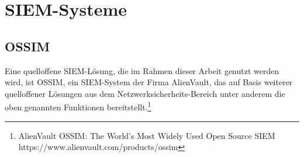 \section{SIEM-Systeme}

\label{sec_state_siem}

\subsection{OSSIM}

Eine quelloffene SIEM-Lösung, die im Rahmen dieser Arbeit genutzt werden wird, ist OSSIM, ein SIEM-System der Firma AlienVault, das auf Basis weiterer quelloffener Lösungen aus dem Netzwerksicherheits-Bereich unter anderem die oben genannten Funktionen bereitstellt.\footnote{
	AlienVault OSSIM: The World’s Most Widely Used Open Source SIEM\\https://www.alienvault.com/products/ossim
}
